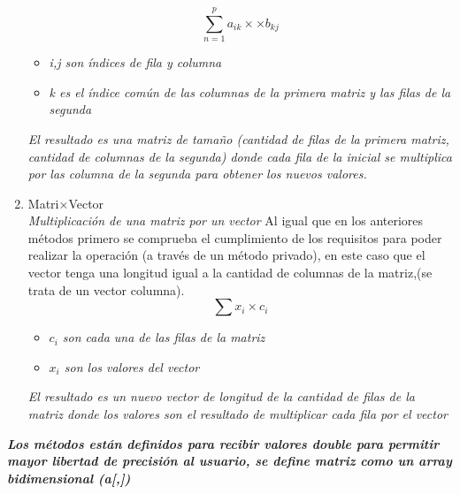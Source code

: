\documentclass[options]{article}
\begin{document}
\begin{enumerate}
    \begin{equation}
        \sum_{n = 1}^{p}  a_{ik} \times \times b_{kj}
    \end{equation}
    \begin{itemize}
        \item \textit{i,j son índices de fila y columna}
        \item \textit{k es el índice común de las columnas de la primera matriz y las filas de la segunda}
    \end{itemize}
    \textit{El resultado es una matriz de tamaño (cantidad de filas de la primera matriz, cantidad de columnas de la segunda) donde cada fila de la inicial se multiplica por las columna de la segunda para obtener los nuevos valores.}
    \item Matri$\times $Vector\\
    \textit{Multiplicación de una matriz por un vector}
    Al igual que en los anteriores métodos primero se comprueba el cumplimiento de los requisitos para poder realizar la operación (a través de un método privado), en este caso que el vector tenga una longitud igual a la cantidad de columnas de la matriz,(se trata de un vector columna).
    \begin{equation}
        \sum x_{i} \times c_{i}
    \end{equation}
    \begin{itemize}
        \item \textit{$c_{i}$ son cada una de las filas de la matriz}
        \item \textit{$x_{i}$ son los valores del vector}
    \end{itemize}
    \textit{El resultado es un nuevo vector de longitud de la cantidad de filas de la matriz donde los valores son el resultado de multiplicar cada fila por el vector}
    
\end{enumerate}
\textbf{\emph{Los métodos están definidos para recibir valores double para permitir mayor libertad de precisión al usuario, se define matriz como un array bidimensional (a[,])}}
\end{document}

